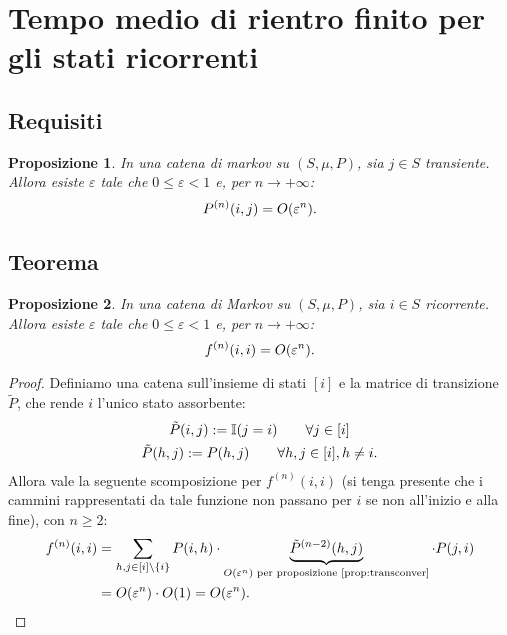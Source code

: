 \documentclass{article}
\theoremstyle{plain}
\newtheorem{prop}{Proposizione}
\newcommand{\indic}{\mathbb I}
\newcommand{\ape}[1]{^{(#1)}}
\renewcommand{\epsilon}{\varepsilon}
\begin{document}
\section{Tempo medio di rientro finito per gli stati ricorrenti}


\subsection{Requisiti}
\begin{prop}\label{prop:transconver}
	In una catena di markov su $(S,\mu,P)$, sia $j\in S$ transiente. Allora esiste $\epsilon$ tale che $0\le\epsilon<1$ e, per $n\to+\infty$:
	\begin{equation*}
		P\ape{n}(i,j) = O(\epsilon^n) \text.
	\end{equation*}
\end{prop}


\subsection{Teorema}
\begin{prop}\label{prop:ricorconv}
	In una catena di Markov su $(S,\mu,P)$, sia $i\in S$ ricorrente. Allora esiste $\epsilon$ tale che $0\le\epsilon<1$ e, per $n\to+\infty$:
	\begin{equation*}
		f\ape{n}(i,i) = O(\epsilon^n) \text.
	\end{equation*}
\end{prop}
\begin{proof}
	Definiamo una catena sull'insieme di stati $[i]$ e la matrice di transizione $\tilde P$, che rende $i$ l'unico stato assorbente:
	\begin{gather*}
		\tilde P(i,j) := \indic(j=i) \qquad\forall j\in[i] \\
		\tilde P(h,j) := P(h,j) \qquad\forall h,j\in[i], h\neq i \text.
	\end{gather*}
	Allora vale la seguente scomposizione per $f\ape{n}(i,i)$ (si tenga presente che i cammini rappresentati da tale funzione non passano per $i$ se non all'inizio e alla fine), con $n\ge2$:
	\begin{align*}
		f\ape{n}(i,i) & = \sum_{h,j\in[i]\setminus\{i\}} P(i,h)\cdot\underbrace{\tilde P\ape{n-2}(h,j)}_{O(\epsilon^n)\text{ per proposizione \ref{prop:transconver}}}\cdot P(j,i) \\
		              & = O(\epsilon^n)\cdot O(1) = O(\epsilon^n) \text. \qedhere
	\end{align*}
\end{proof}
\end{document}
